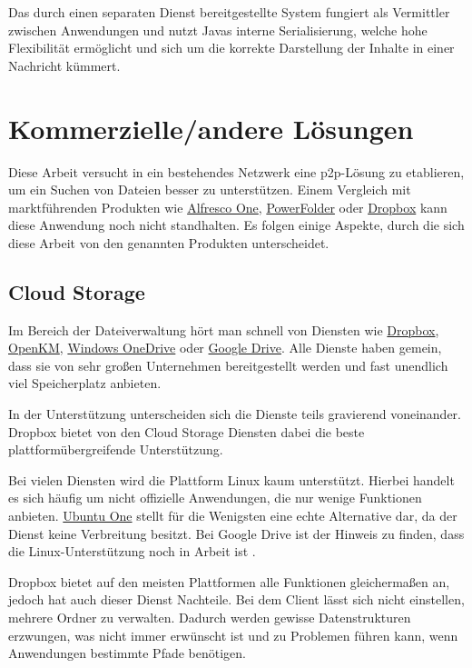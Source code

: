 \documentclass[oneside, ngerman, toc=bibliography,bibliography=totoc,listof=entryprefix, open=right,numbers=noenddot,fontsize=12pt]{scrbook}
\begin{document}
Das durch einen separaten Dienst bereitgestellte System fungiert als Vermittler zwischen Anwendungen und nutzt Javas interne Serialisierung, welche hohe Flexibilität ermöglicht und sich um die korrekte Darstellung der Inhalte in einer Nachricht kümmert.
 


\section{Kommerzielle/andere Lösungen}
Diese Arbeit versucht in ein bestehendes Netzwerk eine \acrshort{p2p}-Lösung zu etablieren, um ein Suchen von Dateien besser zu unterstützen. Einem Vergleich mit marktführenden Produkten wie  \href{http://www.alfresco.com/}{{Alfresco One}}, \href{https://www.powerfolder.com/de/powerfolder-erhalt-qualitatssiegel-it-security-made-in-germany/}{{PowerFolder}} oder \href{https://www.dropbox.com/de/}{{Dropbox}} kann diese Anwendung noch nicht standhalten. Es folgen einige Aspekte, durch die sich diese Arbeit von den genannten Produkten unterscheidet.

\subsection{Cloud Storage}
Im Bereich der Dateiverwaltung hört man schnell von Diensten wie \href{https://www.dropbox.com/de/}{{Dropbox}}, \href{http://www.openkm.com/en/}{{OpenKM}},
\href{https://onedrive.live.com/}{{Windows OneDrive}} oder  \href{https://www.google.com/intl/de_de/drive/}{{Google Drive}}.
Alle Dienste haben gemein, dass sie von sehr großen Unternehmen bereitgestellt werden und fast unendlich viel Speicherplatz anbieten. 

In der Unterstützung unterscheiden sich die Dienste teils gravierend voneinander. {Dropbox} bietet von den Cloud Storage Diensten dabei die beste plattformübergreifende Unterstützung.

Bei vielen Diensten wird die Plattform Linux kaum unterstützt. Hierbei handelt es sich häufig um nicht offizielle Anwendungen, die nur wenige Funktionen anbieten. \href{https://one.ubuntu.com/}{Ubuntu One} stellt für die Wenigsten eine echte Alternative dar, da der Dienst keine Verbreitung besitzt. Bei {Google Drive} ist der Hinweis zu finden, dass die Linux-Unterstützung noch in Arbeit ist \cite{googledrive}.

{Dropbox} bietet auf den meisten Plattformen alle Funktionen gleichermaßen an, jedoch hat auch dieser Dienst Nachteile.
Bei dem Client lässt sich nicht einstellen, mehrere Ordner zu verwalten. Dadurch werden gewisse Datenstrukturen erzwungen, was nicht immer erwünscht ist und zu Problemen führen kann, wenn Anwendungen bestimmte Pfade benötigen.
\end{document}

